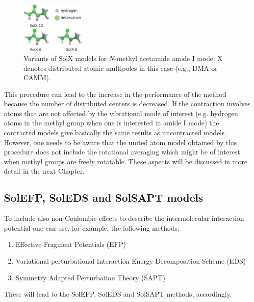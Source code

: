 \documentclass[a4paper,titlepage,twoside,fleqn,12pt]{book}
\begin{document}
\begin{refsection}
\begin{figure}
\vspace{-30pt}
\begin{center}
    \includegraphics[width=0.28\textwidth]{SolXn.eps}
  \end{center}
  \vspace{-18pt}
  \caption{Variants of SolX models for $N$-methyl acetamide amide I mode.
X denotes distributed atomic multipoles in this case (e.g., DMA or CAMM).\label{f:solxn}}
\vspace{-20pt}
\end{figure}
%
\noindent This procedure can lead to the increase in the performance
of the method because the number of distributed centers
is decreased. If the contraction involves atoms that 
are not affected by the vibrational mode of interest (e.g. 
hydrogen atoms in the methyl group when one is interested
in amide I mode) the contracted models give basically 
the same results as uncontracted models. However, one needs to 
be aware that the united atom model obtained by this procedure
does not include the rotational averaging which might be of
interest when methyl groups are freely rotatable. These aspects 
will be discussed in more detail in the next Chapter. 

\subsection{SolEFP, SolEDS and SolSAPT models}

To include also non\hyp{}Coulombic effects to describe 
the intermolecular interaction potential one can use, for example,
the following methods:
%
\begin{enumerate}
  \item Effective Fragment 
Potentials\citep{Day.Jensen.Gordon.Webb.Stevens.Krauss.Garmer.Basch.Cohen.JCP.1996,
Flick.Kosenkov.Hohenstein.Sherrill.Slipchenko.JCTC.2012} (EFP)
  \item Variational\hyp{}perturbational Interaction Energy Decomposition
Scheme\citep{Sokalski.Roszak.Pecul.CPL.1988,
Chalasinski.Szczesniak.MolPhys.1988,Cybulski.Chalasinski.Moszynski.JCP.1990,
Gora.Bartkowiak.Roszak.Leszczynski.JCP.2004} (EDS)
  \item Symmetry Adapted Perturbation Theory\citep{Jeziorski.Moszynski.Szalewicz.ChemRev.1994} (SAPT)
\end{enumerate}
%
These will lead to the SolEFP, SolEDS and SolSAPT methods, accordingly. 


\end{refsection}
\end{document}
